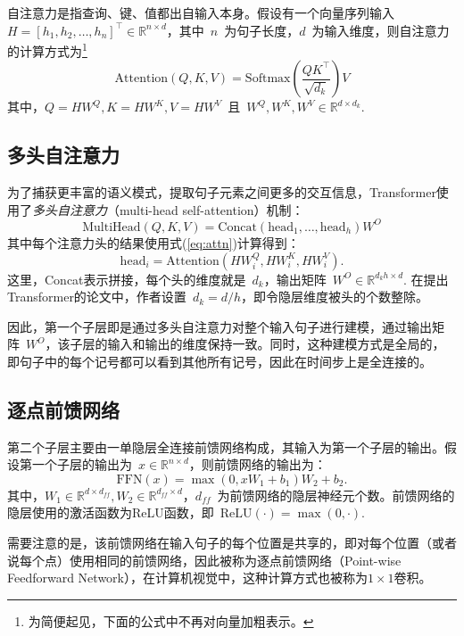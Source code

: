 自注意力是指查询、键、值都出自输入本身。假设有一个向量序列输入~$H = [h_1, h_2, \hdots, h_n]^\top \in \mathbb{R}^{n\times d}$，其中~$n$~为句子长度，$d$~为输入维度，则自注意力的计算方式为\footnote{为简便起见，下面的公式中不再对向量加粗表示。}
\begin{equation}
	\mathrm{Attention}(Q,K,V) = \mathrm{Softmax}(\frac{QK^\top}{\sqrt{d_k}})V
	\label{eq:attn}
\end{equation}
其中，$Q=HW^Q, K=HW^K, V=HW^V$\ 且\ $W^Q, W^K, W^V\in \mathbb{R}^{d\times d_k}$. 

\subsection{多头自注意力}
为了捕获更丰富的语义模式，提取句子元素之间更多的交互信息，Transformer使用了\emph{多头自注意力}（multi-head self-attention）机制：
\begin{equation}
	\mathrm{MultiHead}(Q,K,V) = \mathrm{Concat}(\mathrm{head}_1, \hdots, \mathrm{head}_h)W^O
\end{equation}
其中每个注意力头的结果使用式(\ref{eq:attn})计算得到：
\begin{equation}
	\mathrm{head}_i = \mathrm{Attention}(HW_i^Q, HW_i^K, HW_i^V).
\end{equation}
这里，Concat表示拼接，每个头的维度就是~$d_k$，输出矩阵~$W^O\in \mathbb{R}^{d_kh \times d}$. 在提出Transformer的论文中，作者设置~$d_k=d/h$，即令隐层维度被头的个数整除。

因此，第一个子层即是通过多头自注意力对整个输入句子进行建模，通过输出矩阵~$W^O$，该子层的输入和输出的维度保持一致。同时，这种建模方式是全局的，即句子中的每个记号都可以看到其他所有记号，因此在时间步上是全连接的。

\subsection{逐点前馈网络}
第二个子层主要由一单隐层全连接前馈网络构成，其输入为第一个子层的输出。假设第一个子层的输出为~$x\in \mathbb{R}^{n\times d}$，则前馈网络的输出为：
\begin{equation}
	\mathrm{FFN}(x) = \max(0, xW_1+b_1)W_2+b_2.
\end{equation}
其中，$W_1 \in \mathbb{R}^{d\times d_{ff}}, W_2 \in \mathbb{R}^{d_{ff} \times d}$，$d_{ff}$~为前馈网络的隐层神经元个数。前馈网络的隐层使用的激活函数为ReLU函数，即~$\mathrm{ReLU}(\cdot)=\max(0, \cdot)$.

需要注意的是，该前馈网络在输入句子的每个位置是共享的，即对每个位置（或者说每个点）使用相同的前馈网络，因此被称为逐点前馈网络（Point-wise Feedforward Network），在计算机视觉中，这种计算方式也被称为$1\times 1$卷积。

